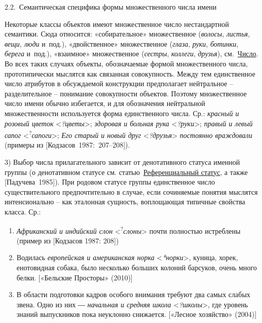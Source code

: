 2.2.~Семантическая специфика формы множественного числа имени

Некоторые классы объектов имеют множественное число нестандартной
семантики. Сюда относится: «собирательное» множественное (\emph{волосы},
\emph{листья}, \emph{вещи}, \emph{люди} и~под.), «двойственное»
множественное (\emph{глаза}, \emph{руки}, \emph{ботинки}, \emph{берега}
и~под.), «взаимное» множественное (\emph{сестры}, \emph{коллеги},
\emph{друзья}), см.~\underline{Число}. Во всех таких случаях объекты,
обозначаемые формой множественного числа, прототипически мыслятся как
связанная совокупность. Между тем единственное число атрибутов в
обсуждаемой конструкции предполагает нейтральное -- разделительное --
понимание совокупности объектов. Поэтому множественное число имени
обычно избегается, и для обозначения нейтральной множественности
используется форма единственного числа. Ср.: \emph{красный и розовый
цветок} \textless{}\emph{?цветы}\textgreater; \emph{здоровая и больная
рука} \textless{}\emph{?руки}\textgreater; \emph{правый и левый сапог}
\textless{}\textsuperscript{?}\emph{сапоги}\textgreater; \emph{Его
старый и новый друг} \textless{}\emph{?друзья}\textgreater{}
\emph{постоянно враждовали} (примеры из {[}Кодзасов~1987:~207--208{]}).

3) Выбор числа прилагательного зависит от денотативного статуса именной
группы (о денотативном статусе см. статью~\underline{Референциальный
статус}, а также {[}Падучева~1985{]}). При родовом статусе группы
единственное число существительного предпочтительно в случае, если
сочиняемые понятия мыслятся интенсионально -- как эталонная сущность,
воплощающая типичные свойства класса. Ср.:

\begin{enumerate}
\def\labelenumi{(\arabic{enumi})}
\setcounter{enumi}{145}
\item
  \emph{Африканский и индийский слон}
  \textless{}\textsuperscript{?}\emph{слоны}\textgreater{} почти
  полностью истреблены (пример из {[}Кодзасов 1987: 208{]})
\item
  Водилась \emph{европейская и американская норка}
  \textless{}\emph{*норки}\textgreater, куница, хорек, енотовидная
  собака, было несколько больших колоний барсуков, очень много белки.
  {[}«Бельские Просторы» (2010){]}
\item
  В области подготовки кадров особого внимания требуют два самых слабых
  звена. Одно из них ― \emph{начальная и средняя школа}
  \textless{}\emph{?школы}\textgreater, где уровень знаний выпускников
  пока неуклонно снижается. {[}«Лесное хозяйство» (2004){]}
\end{enumerate}

